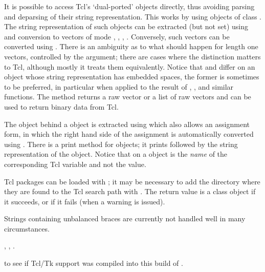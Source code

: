 \begin{Details}
It is possible to access Tcl's `dual-ported' objects directly,
thus avoiding parsing and deparsing of their string representation.
This works by using objects of class .  The string
representation of such objects can be extracted (but not set) using
 and conversion to vectors of mode ,
, , .  Conversely, such
vectors can be converted using .  There is an
ambiguity as to what should happen for length one vectors, controlled
by the  argument; there are cases where the distinction
matters to Tcl, although mostly it treats them equivalently.  Notice
that  and  differ on an object whose
string representation has embedded spaces, the former is sometimes to
be preferred, in particular when applied to the result of
, , and similar functions.  The
 method returns a raw vector or a list of raw vectors and
can be used to return binary data from Tcl.

The object behind a  object is extracted using
 which also allows an assignment form, in which the
right hand side of the assignment is automatically converted using
.  There is a print method for  objects;
it prints  followed by the string representation of the
object.  Notice that  on a  object is
the \emph{name} of the corresponding Tcl variable and not the value.

Tcl packages can be loaded with ; it may be necessary
to add the directory where they are found to the Tcl search path with
.  The return value is a class  object
if it succeeds, or  if it fails (when a warning is issued).
\end{Details}
%
\begin{Note}\relax
 Strings containing unbalanced braces are currently not handled
well in many circumstances.
\end{Note}
%
\begin{SeeAlso}\relax
{},
,
.

 to see if Tcl/Tk support was
compiled into this build of \R{}.
\end{SeeAlso}
%
